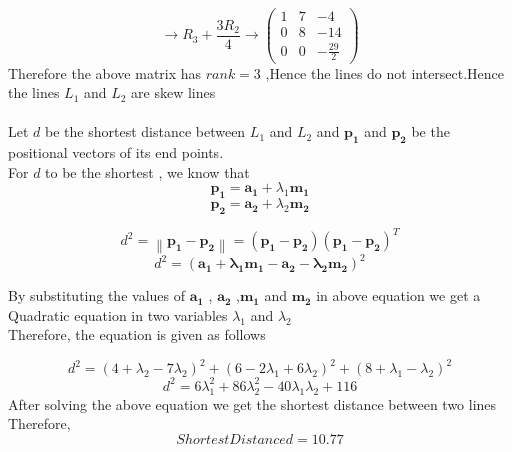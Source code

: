\documentclass[journal,10pt,twocolumn]{article}
\providecommand{\norm}[1]{\left\lVert#1\right\rVert}
\let\vec\mathbf
\newcommand{\myvec}[1]{\ensuremath{\begin{pmatrix}#1\end{pmatrix}}}
\begin{document}
\begin{equation}
	\rightarrow R_3+\frac{3R_2}{4} \rightarrow \myvec{1&7&-4\\0&8&-14\\ 0&0&-\frac{29}{2}}
\end{equation}
Therefore the above matrix has $rank = 3$ ,Hence the lines do not intersect.Hence the lines $L_1$ and $L_2$ are skew lines\\\\
Let $d$ be the shortest distance between $L_1$ and $L_2$ and $\vec{p_1}$ and $\vec{p_2}$ be the positional vectors of its end points. \\
For $d$ to be the shortest , we know that\\
\begin{equation}
	\vec{p_1} = \vec{a_1} + \lambda_1 \vec{m_1}
\end{equation}
\begin{equation}
	\vec{p_2} = \vec{a_2} + \lambda_2 \vec{m_2}
\end{equation}

\begin{equation}
	d^2 = \norm{\vec{p_1} - \vec{p_2}} = (\vec{p_1} - \vec{p_2})(\vec{p_1} - \vec{p_2})^T
\end{equation}
\begin{equation}
	d^2 = (\vec{a_1 + \lambda_1 \vec{m_1} - \vec{a_2} - \lambda_2 \vec{m_2}})^2
\end{equation}

By substituting the values of $\vec{a_1}$ , $\vec{a_2}$ ,$\vec{m_1}$ and $\vec{m_2}$ in above equation we get a Quadratic equation in two variables $\lambda_1$ and $\lambda_2$\\
Therefore, the equation is given as follows

\begin{equation}
	d^2 = (4 + \lambda_2 - 7\lambda_2)^2 + (6 - 2\lambda_1 + 6\lambda_2)^2 + (8 + \lambda_1 -\lambda_2)^2
\end{equation}
\begin{equation}
	d^2 = 6\lambda_1^2 + 86\lambda_2^2 - 40\lambda_1 \lambda_2 + 116
\end{equation}
After solving the above equation we get the shortest distance between two lines\\


Therefore,
\begin{equation}
	Shortest Distance d = 10.77
\end{equation}\\\\
\end{document}
